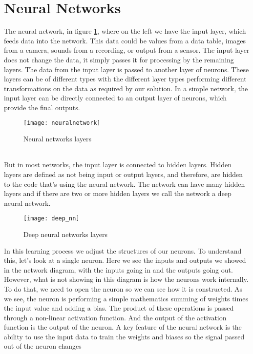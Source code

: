 \section{Neural Networks}
\label{sec:neuralnetwork}
%
The neural network, in figure \ref{fig:nn_layer}, where on the 
left we have the input layer, which feeds data into the network.
This data could be values from a data table, images from a camera, sounds from a
recording, or output from a sensor.
The input layer does not change the data, it simply passes it for processing by
the remaining layers. The data from the input layer is passed to another layer
of neurons.
These layers can be of different types with the different layer types performing
different transformations on the data as required by our solution. In a simple
network, the input layer can be directly connected to an output layer of neurons,
which provide the final outputs.\linebreak
%
\begin{figure}[!h]
\centering
\texttt{[image: neuralnetwork]}
\caption{Neural networks layers}
\label{fig:nn_layer}
\end{figure}
%
\\But in most networks, the input layer is connected to hidden layers.
Hidden layers are defined as not being input or output layers, and therefore,
are hidden to the code that's using the neural network.
The network can have many hidden layers and if there are two or more hidden
layers we call the network a deep neural network.
%
\begin{figure}[!h]
\centering
\texttt{[image: deep\_nn]}
\caption{Deep neural networks layers}
\label{fig:deepnn}
\end{figure}
%
In this learning process we adjust the structures of our neurons.
To understand this, let's look at a single neuron. Here we see the inputs and
outputs we showed in the network diagram, with the inputs going in and the
outputs going out.
However, what is not showing in this diagram is how the neurons work internally.
To do that, we need to open the neuron so we can see how it is constructed.
As we see, the neuron is performing a simple mathematics summing of weights times
the input value and adding a bias.
The product of these operations is passed through a non-linear activation function.
And the output of the activation function is the output of the neuron.
A key feature of the neural network is the ability to use the input data to
train the weights and biases so the signal passed out of the neuron changes
